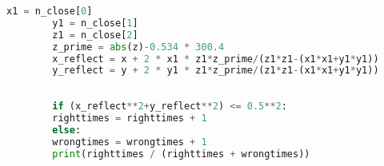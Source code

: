 \documentclass{cumcmthesis}
\begin{document}
\begin{appendices}
\begin{lstlisting}[language={python}]
		x1 = n_close[0]
		y1 = n_close[1]
		z1 = n_close[2]
		z_prime = abs(z)-0.534 * 300.4
		x_reflect = x + 2 * x1 * z1*z_prime/(z1*z1-(x1*x1+y1*y1))
		y_reflect = y + 2 * y1 * z1*z_prime/(z1*z1-(x1*x1+y1*y1))
		
		
		if (x_reflect**2+y_reflect**2) <= 0.5**2:
		righttimes = righttimes + 1
		else:
		wrongtimes = wrongtimes + 1
		print(righttimes / (righttimes + wrongtimes))
		
	\end{lstlisting}  %
\end{appendices}
\end{document}
